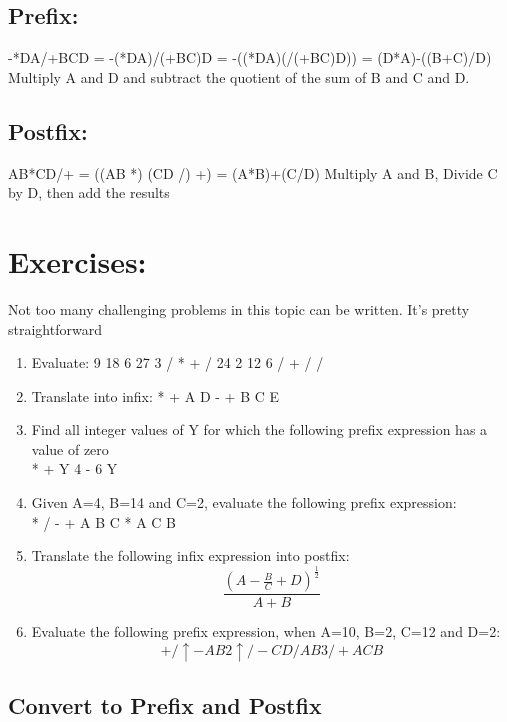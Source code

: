\documentclass[11pt,letterpaper]{article}
\begin{document}
\subsection{Prefix:}
-*DA/+BCD = -(*DA)/(+BC)D = -((*DA)(/(+BC)D)) = (D*A)-((B+C)/D) Multiply A and D and subtract the quotient of the sum of B and C and D.

\subsection{Postfix:}
AB*CD/+ = ((AB *) (CD /) +) = (A*B)+(C/D)
Multiply A and B, Divide C by D, then add the results

\section{Exercises:}
Not too many challenging problems in this topic can be written. It's pretty straightforward

\begin{enumerate}

\item Evaluate: 9 18 6 27 3 / * + / 24 2 12 6 / + / /

\item Translate into infix: * + A D - + B C E

\item Find all integer values of Y for which the following prefix expression has
a value of zero\\
* + Y 4 - 6 Y

\item Given A=4, B=14 and C=2, evaluate the following prefix expression: \\
* / - + A B C * A C B

\item Translate the following infix expression into postfix:\\
\begin{equation*}
\frac{(A-\frac{B}{C}+D)^{\frac{1}{2}}}{A+B}
\end{equation*}

\item Evaluate the following prefix expression, when A=10, B=2, C=12 and D=2:\\
\begin{equation*}
+ / \uparrow - A B 2 \uparrow / - C D / A B 3 / + A C B
\end{equation*}
\end{enumerate}

\subsection{Convert to Prefix and Postfix}
\label{sec:convert}
\end{document}
